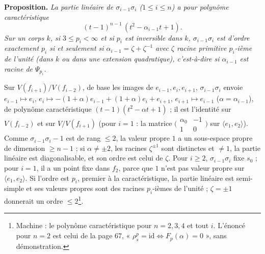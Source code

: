 \documentclass[11pt,a4paper]{article}
\begin{document}
\textbf{Proposition.} \emph{La partie linéaire de $\sigma_{i-1}\sigma_i$ ($1 \leq i
\leq n$) a pour polynôme caractéristique}
\[
(t - 1)^{n-1}\,(t^2 - \alpha_{i-1} t + 1) .
\]
\emph{Sur un corps $k$, si $3 \leq p_i < \infty$ et si $p_i$ est inversible dans
$k$, $\sigma_{i-1}\sigma_i$ est d'ordre exactement $p_i$ si et seulement si
$\alpha_{i-1} = \zeta + \zeta^{-1}$ avec $\zeta$ racine primitive $p_i$-ième de
l'unité (dans $k$ ou dans une extension quadratique), c'est-à-dire si
$\alpha_{i-1}$ est racine de $\Psi_{p_i}$.}

Sur $V(f_{i+1}) / V(f_{i-2})$, de base les images de $e_{i-1}, e_i, e_{i+1}$,
$\sigma_{i-1}\sigma_i$ envoie $e_{i-1} \mapsto e_i$, $e_i \mapsto -(1 +
\alpha)e_{i-1} + (1 + \alpha)e_i + e_{i+1}$, $e_{i+1} \mapsto e_{i-1}$ ($\alpha =
\alpha_{i-1}$), de polynôme caractéristique $(t - 1)(t^2 - \alpha t + 1)$ ; il est
l'identité sur $V(f_{i-2})$ et sur $V / V(f_{i+1})$ (pour $i = 1$ : la matrice
$\bigl(\begin{smallmatrix} \alpha_0 & -1 \\ 1 & 0 \end{smallmatrix}\bigr)$ sur
$\langle e_1, e_2 \rangle$). Comme $\sigma_{i-1}\sigma_i - 1$ est de rang $\leq
2$, la valeur propre $1$ a un sous-espace propre de dimension $\geq n - 1$ ; si
$\alpha \neq \pm 2$, les racines $\zeta^{\pm 1}$ sont distinctes et $\neq 1$,
la partie linéaire est diagonalisable, et son ordre est celui de $\zeta$. Pour
$i \geq 2$, $\sigma_{i-1}\sigma_i$ fixe $s_0$ ; pour $i = 1$, il a un point fixe
dans $f_2$, parce que $1$ n'est pas valeur propre sur $\langle e_1, e_2 \rangle$.
Si l'ordre est $p_i$, premier à la caractéristique, la partie linéaire est
semi-simple et ses valeurs propres sont des racines $p_i$-ièmes de l'unité ;
$\zeta = \pm 1$ donnerait un ordre $\leq 2$\footnote{Machine : le polynôme
caractéristique pour $n = 2, 3, 4$ et tout $i$. L'énoncé pour $n = 2$ est celui
de la page 67, « $\rho_s^p = \mathrm{id} \iff F_p(\alpha) = 0$ », sans
démonstration.}.
\end{document}
